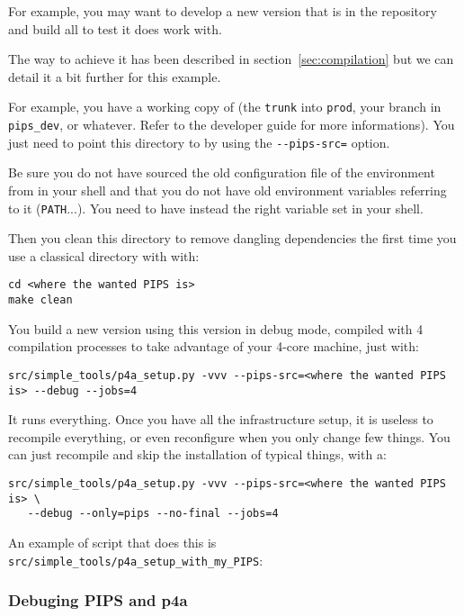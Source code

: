 \documentclass[a4paper]{article}
\begin{document}
For example, you may want to develop a new \Apips version that is in the
\Acri{} \Asvn repository and build all \Apfa to test it does work with.

The way to achieve it has been described in section~\ref{sec:compilation}
but we can detail it a bit further for this example.

For example, you have a \Asvn working copy of \Apips (the \texttt{trunk}
into \texttt{prod}, your branch in \verb|pips_dev|, or whatever. Refer
to the \Apips developer guide for more informations). You just need to
point this directory to \Apfa by using the \verb|--pips-src=| option.

Be sure you do not have sourced the old configuration file of the \Apips
\Asvn environment from \Acri in your shell and that you do not have old
environment variables referring to it (\verb|PATH|...). You need to have
instead the right \Apfa variable set in your shell.

Then you clean this directory to remove dangling dependencies the first
time you use a classical \Apips directory with \Apfa with:
\begin{verbatim}
cd <where the wanted PIPS is>
make clean
\end{verbatim}

You build a new \Apfa version using this \Apips version in debug mode,
compiled with 4 compilation processes to take advantage of your 4-core
machine, just with:
\begin{verbatim}
src/simple_tools/p4a_setup.py -vvv --pips-src=<where the wanted PIPS is> --debug --jobs=4
\end{verbatim}

It runs everything. Once you have all the infrastructure setup, it is
useless to recompile everything, or even reconfigure \Apips when you only
change few things. You can just recompile \Apips and skip the installation
of typical \Apfa things, with a:
\begin{verbatim}
src/simple_tools/p4a_setup.py -vvv --pips-src=<where the wanted PIPS is> \
   --debug --only=pips --no-final --jobs=4
\end{verbatim}

An example of script that does this is
\verb|src/simple_tools/p4a_setup_with_my_PIPS|:



\subsubsection{Debuging PIPS and p4a}
\label{sec:debuging-pips-p4a}
\end{document}
